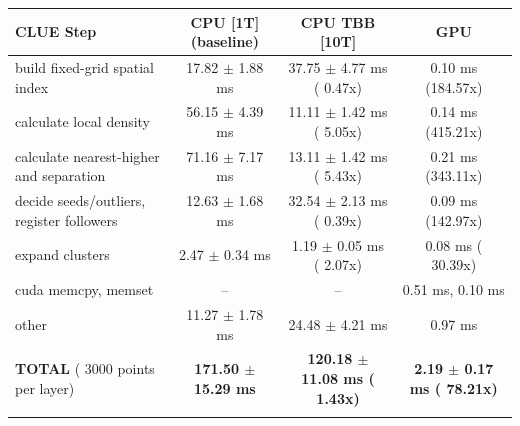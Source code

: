     \begin{tabular}{l|c|c|c}
    \hline
    CLUE Step                                 & CPU [1T] (baseline)         & CPU TBB [10T]                         & GPU                       \\ \hline
    build fixed-grid spatial index            &  17.82 $\pm$  1.88 ms       &  37.75 $\pm$  4.77 ms ( 0.47x)        &   0.10 ms (184.57x)       \\
    calculate local density                   &  56.15 $\pm$  4.39 ms       &  11.11 $\pm$  1.42 ms ( 5.05x)        &   0.14 ms (415.21x)       \\
    calculate nearest-higher and separation   &  71.16 $\pm$  7.17 ms       &  13.11 $\pm$  1.42 ms ( 5.43x)        &   0.21 ms (343.11x)       \\
    decide seeds/outliers, register followers &  12.63 $\pm$  1.68 ms       &  32.54 $\pm$  2.13 ms ( 0.39x)        &   0.09 ms (142.97x)       \\
    expand clusters                           &   2.47 $\pm$  0.34 ms       &   1.19 $\pm$  0.05 ms ( 2.07x)        &   0.08 ms ( 30.39x)       \\ \hline
    cuda memcpy, memset                       & --                          & --                                    &   0.51 ms,   0.10 ms      \\
    other                                     &  11.27 $\pm$  1.78 ms       &  24.48 $\pm$  4.21 ms                 &   0.97 ms                 \\ \hline
    \textbf{TOTAL} ( 3000 points per layer)   & \textbf{171.50 $\pm$ 15.29 ms} & \textbf{120.18 $\pm$ 11.08 ms ( 1.43x)} & \textbf{  2.19 $\pm$  0.17 ms ( 78.21x)}  \\
    \hline
    \multicolumn{4}{c}{}
    \end{tabular}
    \linebreak


